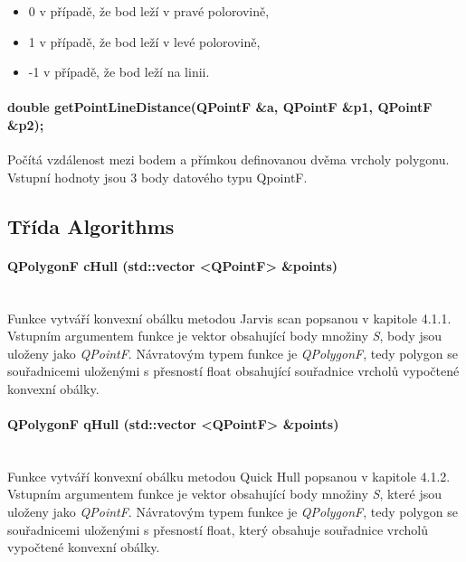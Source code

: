 \documentclass[11pt]{article}
\begin{document}
		\begin{itemize}
			\item 0 v případě, že bod leží v pravé polorovině,
			\item 1 v případě, že  bod leží v levé polorovině,
			\item -1 v případě, že bod leží na linii.
		\end{itemize}
		
		\paragraph{double getPointLineDistance(QPointF \&a, QPointF \&p1, QPointF \&p2);}
		Počítá vzdálenost mezi bodem a přímkou definovanou dvěma vrcholy polygonu. Vstupní hodnoty jsou 3 body datového typu QpointF. 
		
		\subsection{Třída Algorithms}
		\paragraph{QPolygonF cHull (std::vector <QPointF> \&points)}\mbox{}\\
		Funkce vytváří konvexní obálku metodou Jarvis scan popsanou v kapitole 4.1.1. Vstupním argumentem funkce je vektor obsahující body množiny \textit{S}, body jsou uloženy jako \textit{QPointF}. 	Návratovým typem funkce je \textit{QPolygonF}, tedy polygon se souřadnicemi uloženými s přesností float obsahující souřadnice vrcholů vypočtené konvexní obálky.
		
		\paragraph{QPolygonF qHull (std::vector <QPointF> \&points)}\mbox{}\\
		Funkce vytváří konvexní obálku metodou Quick Hull popsanou v kapitole 4.1.2. Vstupním argumentem funkce je vektor obsahující body množiny \textit{S}, které jsou uloženy jako \textit{QPointF}. Návratovým typem funkce je \textit{QPolygonF}, tedy polygon se souřadnicemi uloženými s přesností float, který obsahuje souřadnice vrcholů vypočtené konvexní obálky. 
\end{document}
